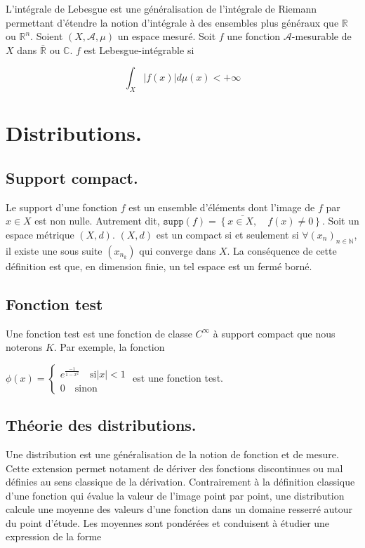 \noindent L'intégrale de Lebesgue est une généralisation de l'intégrale de Riemann permettant d'étendre la notion d'intégrale à des ensembles plus généraux que $\mathbb{R}$ ou $\mathbb{R}^n$. Soient $(X, \mathcal{A}, \mu)$ un espace mesuré. Soit $f$ une fonction $\mathcal{A}$-mesurable de $X$ dans 
$\bar{\mathbb{R}}$ ou $\mathbb{C}$. $f$ est Lebesgue-intégrable si 

\begin{equation}
    \int_{X} |f(x)| d\mu(x) < +\infty
\end{equation}

\section{Distributions.}
\subsection{Support compact.} 

\noindent Le support d'une fonction $f$ est un ensemble d'éléments dont l'image de $f$ par $x \in X$ est non nulle. Autrement dit, $\bar{ \texttt{supp}(f) = \left\{ x \in X, \quad f(x) \neq 0 \right\} }$. Soit un espace métrique $(X, d)$. $(X,d)$ est un compact si et seulement si $\forall (x_n)_{n \in \mathbb{N}}$, 
il existe une sous suite $(x_{n_{k}})$ qui converge dans $X$. La conséquence de cette définition est que, en dimension finie, un tel espace est un fermé borné. \newline

\subsection{Fonction test}

\noindent Une fonction test est une fonction de classe $C^{\infty}$ à support compact que nous noterons $K$. Par exemple, la fonction 

$\phi(x) = \begin{cases} 
    e^{\frac{-1}{1-x^2}} \quad \text{si} |x| < 1 \\ 
    0 \quad \text{sinon} 
\end{cases}$ 
est une fonction test. \newline

\subsection{Théorie des distributions.} 

\noindent Une distribution est une généralisation de la notion de fonction et de mesure. Cette extension permet notament de dériver des fonctions discontinues ou mal définies au sens classique de la dérivation. Contrairement à la définition classique d'une fonction qui évalue la valeur de l'image point
par point, une distribution calcule une moyenne des valeurs d'une fonction dans un domaine resserré autour du point d'étude. Les moyennes sont pondérées et conduisent à étudier une expression de la forme 

